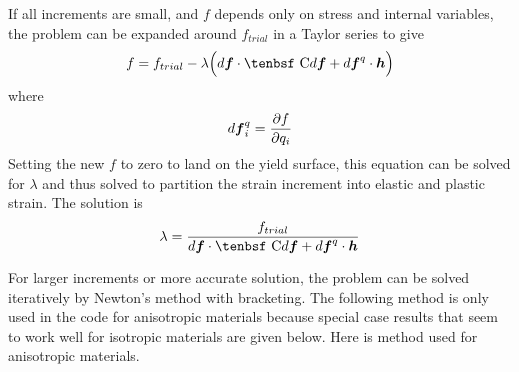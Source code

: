 \documentclass[11pt]{article}
\renewcommand{\vec}[1]{\boldsymbol{#1}}
\def\C{\hbox{\tenbsf C}}
\def\df{d \vec{f}}
\def\dfq{d \vec{f}^q}
\begin{document}
If all increments are small, and $f$ depends only on stress and internal variables, the problem can be expanded around $f_{trial}$ in a Taylor series to give
\begin{equation}
    f  = f_{trial} - \lambda\Bigl( \df \cdot \C \df + \dfq \cdot \vec h \Bigr)
\end{equation}
where
\begin{equation}
\dfq_i = {\partial f\over \partial q_i}
\end{equation}
Setting the new $f$ to zero to land on the yield surface, this equation can be solved for $\lambda$ and thus solved to partition the strain increment into elastic and plastic strain. The solution is
\begin{equation}
        \lambda = { f_{trial}   \over  \df\cdot \C\df + \dfq \cdot \vec h }     \label{lambdaInitial}
\end{equation}

For larger increments or more accurate solution, the problem can be solved iteratively by Newton's method with bracketing. The following method is only used in the code for anisotropic materials because special case results that seem to work well for isotropic materials are given below. Here is method used for anisotropic materials.
\end{document}
